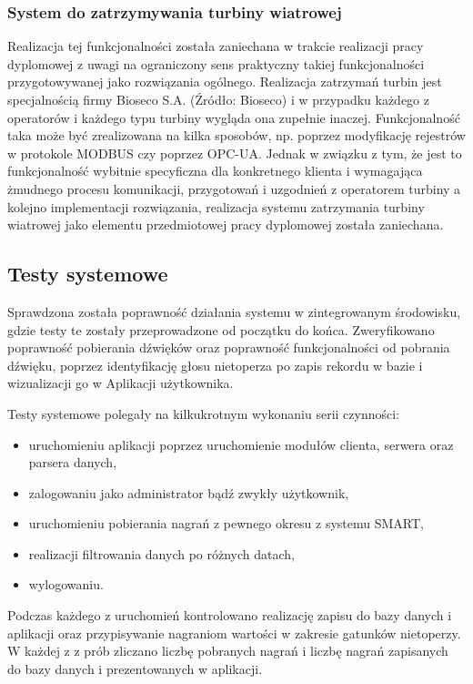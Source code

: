 \documentclass{sprz}
\begin{document}
\subsubsection{System do zatrzymywania turbiny wiatrowej}
Realizacja tej funkcjonalności została zaniechana w trakcie realizacji pracy dyplomowej z uwagi na ograniczony sens praktyczny takiej funkcjonalności przygotowywanej jako rozwiązania ogólnego. Realizacja zatrzymań turbin jest specjalnością firmy Bioseco S.A. (Źródło: Bioseco) i w przypadku każdego z operatorów i każdego typu turbiny wygląda ona zupełnie inaczej. Funkcjonalność taka może być zrealizowana na kilka sposobów, np. poprzez modyfikację rejestrów w protokole MODBUS czy poprzez OPC-UA. Jednak w związku z tym, że jest to funkcjonalność wybitnie specyficzna dla konkretnego klienta i wymagająca żmudnego procesu komunikacji, przygotowań i uzgodnień z operatorem turbiny a kolejno implementacji rozwiązania, realizacja systemu zatrzymania turbiny wiatrowej jako elementu przedmiotowej pracy dyplomowej została zaniechana.

\subsection{Testy systemowe}
Sprawdzona została poprawność działania systemu w zintegrowanym środowisku, gdzie testy te zostały przeprowadzone od początku do końca. Zweryfikowano poprawność pobierania dźwięków oraz poprawność funkcjonalności od pobrania dźwięku, poprzez identyfikację głosu nietoperza po zapis rekordu w bazie i wizualizacji go w Aplikacji użytkownika.

Testy systemowe polegały na kilkukrotnym wykonaniu serii czynności:

\begin{itemize}
  \item uruchomieniu aplikacji poprzez uruchomienie modułów clienta, serwera oraz parsera danych,
  \item zalogowaniu jako administrator bądź zwykły użytkownik,
  \item uruchomieniu pobierania nagrań z pewnego okresu z systemu SMART,
  \item realizacji filtrowania danych po różnych datach,
  \item wylogowaniu.
\end{itemize}

Podczas każdego z uruchomień kontrolowano realizację zapisu do bazy danych i aplikacji oraz przypisywanie nagraniom wartości w zakresie gatunków nietoperzy.
W każdej z z prób zliczano liczbę pobranych nagrań i liczbę nagrań zapisanych do bazy danych i prezentowanych w aplikacji.
\end{document}
